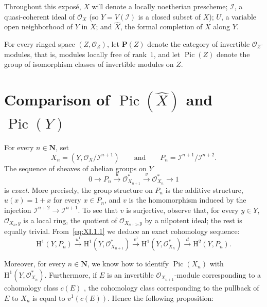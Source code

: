 \documentclass[11pt,a4paper,oneside]{book}
\providecommand{\pageoriginale}{%
  \refstepcounter{pageoriginal}%
  \marginpar{\raggedright\footnotesize\bfseries\thepageoriginal}%
  \xspace}
\providecommand{\Ii}{\mathcal I}
\providecommand{\NN}{\mathbf N}
\providecommand{\PP}{\mathbf P}
\providecommand{\OX}{\mathcal O_X}
\providecommand{\Pic}{\operatorname{Pic}}
\theoremstyle{plain}
\theoremstyle{definition}
\theoremstyle{remark}
\begin{document}
\medskip
Throughout this expos\'e, $X$ will denote a locally noetherian prescheme;
$\Ii$, a quasi-coherent ideal of $\OX$ (so $Y=V(\Ii)$ is a closed subset of
$X$); $U$, a variable open neighborhood of $Y$ in $X$; and $\widehat X$,
the formal completion of $X$ along $Y$.

For every ringed space $(Z,\mathcal O_Z)$, let $\PP(Z)$\label{pXI.1}
denote the category of invertible $\mathcal O_Z$-modules, that is, modules locally
free of rank~$1$, and let $\Pic(Z)$ denote the group of isomorphism classes of
invertible modules on $Z$.

\section{\texorpdfstring{Comparison of $\Pic(\widehat X)$ and $\Pic(Y)$}{Comparison of Pic(X-hat) and Pic(Y)}}\label{XI.1}

For every $n\in\NN$, set
\[
X_n=(Y,\OX/\Ii^{n+1})
\qquad\text{and}\qquad
P_n=\Ii^{n+1}/\Ii^{n+2}.
\]
The sequence of sheaves of abelian groups on $Y$
\begin{equation}\label{eq:XI.1.1}
0\longrightarrow P_n\xrightarrow{u}\mathcal O_{X_{n+1}}^*
\xrightarrow{v}\mathcal O_{X_n}^*\longrightarrow 1
\end{equation}
is \emph{exact}. More precisely, the group structure on $P_n$ is the additive
structure, $u(x)=1+x$ for every $x\in P_n$, and $v$ is the homomorphism induced
by the injection $\Ii^{n+2}\longrightarrow\Ii^{n+1}$. To see that $v$ is
surjective, observe that, for every $y\in Y$, $\mathcal O_{X_n,y}$ is a local
ring, the quotient of $\mathcal O_{X_{n+1},y}$ by a nilpotent ideal; the rest is
equally trivial. From~\eqref{eq:XI.1.1} we deduce an exact cohomology sequence:
\begin{equation*}\tag{$*$}\label{eq:XI.1.*}
\mathrm H^1(Y,P_n)\xrightarrow{u^1}\mathrm H^1(Y,\mathcal O_{X_{n+1}}^*)
\xrightarrow{v^1}\mathrm H^1(Y,\mathcal O_{X_n}^*)
\xrightarrow{d}\mathrm H^2(Y,P_n).
\end{equation*}

Moreover, for every $n\in\NN$, we know how to identify
$\Pic(X_n)$ with $\mathrm H^1(Y,\mathcal O_{X_n}^*)$. Furthermore, if $E$
is an invertible $\mathcal O_{X_{n+1}}$-module corresponding to a cohomology
class $c(E)$\pageoriginale, the cohomology class corresponding to the pullback
of $E$ to $X_n$ is equal to $v^1(c(E))$. Hence the following proposition:
\end{document}
